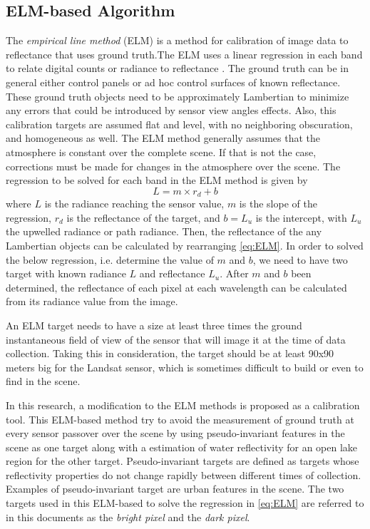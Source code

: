 \subsection{ELM-based Algorithm}
The {\it empirical line method} (ELM) is a method for calibration of image data to reflectance that uses ground truth.The ELM uses a linear regression in each band to relate digital counts or radiance to reflectance \cite{Schott}. The ground truth can be in general  either control panels or ad hoc control surfaces of known reflectance. These ground truth objects need to be approximately Lambertian to minimize any errors that could be introduced by sensor view angles effects. Also, this calibration targets are assumed flat and level, with no neighboring obscuration, and homogeneous as well. The ELM method generally assumes that the atmosphere is constant over the complete scene. If that is not the case, corrections must be made for changes in the atmosphere over the scene. The regression to be solved for each band in the ELM method is given by
\begin{equation}
	\label{eq:ELM} 
	L = m\times r_d + b
\end{equation}
where $L$ is the radiance reaching the sensor value, $m$ is the slope of the regression, $r_d$ is the reflectance of the target, and $b=L_u$ is the intercept, with $L_u$ the upwelled radiance or path radiance. Then, the reflectance of the any Lambertian objects can be calculated by rearranging \autoref{eq:ELM}. In order to solved the below regression, i.e. determine the value of $m$ and $b$, we need to have two target with known radiance $L$ and reflectance $L_u$. After $m$ and $b$ been determined, the reflectance of each pixel at each wavelength can be calculated from its radiance value from the image.

An ELM target needs to have a size at least three times the ground instantaneous field of view of the sensor that will image it at the time of data collection. Taking this in consideration, the target should be at least 90x90 meters big for the Landsat sensor, which is sometimes difficult to build or even to find in the scene. 

In this research, a modification to the ELM methods is proposed as a calibration tool. This ELM-based method try to avoid the measurement of ground truth at every sensor passover over the scene by using pseudo-invariant features in the scene as one target along with a estimation of water reflectivity for an open lake region for the other target. Pseudo-invariant targets are defined as targets whose reflectivity properties do not change rapidly between different times of collection. Examples of pseudo-invariant target are urban features in the scene. The two targets used in this ELM-based to solve the regression in \autoref{eq:ELM} are referred to in this documents as the {\it bright pixel} and the {\it dark pixel}.

